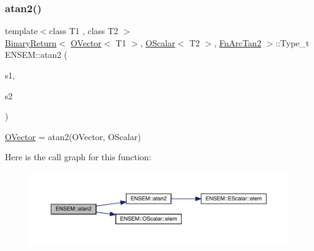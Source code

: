 \subsubsection{\texorpdfstring{atan2()}{atan2()}\hspace{0.1cm}{\footnotesize\ttfamily [2/3]}}
{\footnotesize\ttfamily template$<$class T1 , class T2 $>$ \\
\mbox{\hyperlink{structENSEM_1_1BinaryReturn}{Binary\+Return}}$<$ \mbox{\hyperlink{classENSEM_1_1OVector}{O\+Vector}}$<$ T1 $>$, \mbox{\hyperlink{classENSEM_1_1OScalar}{O\+Scalar}}$<$ T2 $>$, \mbox{\hyperlink{structENSEM_1_1FnArcTan2}{Fn\+Arc\+Tan2}} $>$\+::Type\+\_\+t E\+N\+S\+E\+M\+::atan2 (\begin{DoxyParamCaption}\item[{const \mbox{\hyperlink{classENSEM_1_1OVector}{O\+Vector}}$<$ T1 $>$ \&}]{s1,  }\item[{const \mbox{\hyperlink{classENSEM_1_1OScalar}{O\+Scalar}}$<$ T2 $>$ \&}]{s2 }\end{DoxyParamCaption})\hspace{0.3cm}{\ttfamily [inline]}}



\mbox{\hyperlink{classENSEM_1_1OVector}{O\+Vector}} = atan2(\+O\+Vector, O\+Scalar) 

Here is the call graph for this function\+:\nopagebreak
\begin{figure}[H]
\begin{center}
\leavevmode
\includegraphics[width=350pt]{da/d59/group__obsvector_ga6f583b255bc8225ce768b9b916c9e271_cgraph}
\end{center}
\end{figure}
\mbox{\label{group__obsvector_gaf9e56538a48f9abad6df1dda8297795b}} 
